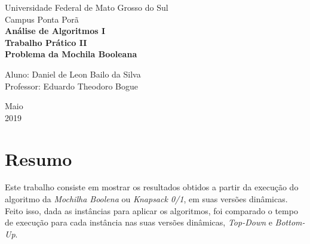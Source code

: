 \documentclass[a4paper, 12pt]{article}
\begin{document}
\begin{titlepage}
    \begin{center}
		\LARGE{Universidade Federal de Mato Grosso do Sul}\\
		\vspace{5pt}
        \large{Campus Ponta Porã}\\ 
        \large{{\textbf{Análise de Algoritmos I}}}\\ 
        \vspace{15pt}
        \vspace{95pt}
        \textbf{\large{Trabalho Prático II}}\\
        \vspace{15pt}
        \textbf{\LARGE{Problema da Mochila Booleana}}\\
        \vspace{3,5cm}
    \end{center}
    
    \begin{flushleft}
        \begin{tabbing}
            Aluno: Daniel de Leon Bailo da Silva\\            
            Professor: Eduardo Theodoro Bogue\\
    \end{tabbing}
 \end{flushleft}
    \vspace{1cm}
    
    \begin{center}
        \vspace{\fill}
            Maio\\
         2019
            \end{center}
\end{titlepage}

\clearpage
\tableofcontents
\thispagestyle{empty}
\clearpage


\section*{Resumo}
\label{sec:resumo}
Este trabalho consiste em mostrar os resultados obtidos a partir da execução
do algoritmo da {\it Mochilha Boolena} ou {\it Knapsack 0/1}, em suas versões dinâmicas.
Feito isso, dada as instâncias para aplicar os algoritmos, foi comparado o tempo de execução para cada instância 
nas suas versões dinâmicas, {\it Top-Down} e  {\it Bottom-Up}.\\
\end{document}
